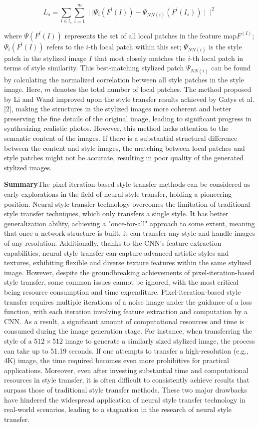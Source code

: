 \begin{equation}
    L_s=\sum_{l\in {l_s}}\sum_{i=1}^m \mid\mid\Psi_i(F^l(I))-\Psi_{NN(i)}(F^l(I_s))\mid\mid^2
\end{equation}

where $\Psi(F^l(I))$ represents the set of all local patches in the feature map$F^(I)$; $\Psi_i(F^l(I))$ refers to the $i$-th local patch within this set; $\Psi_{NN(i)}$ is the style patch in the stylized image $I$ that most closely matches the $i$-th local patch in terms of style similarity. This best-matching stylized patch $\Psi_{NN(i)}$ can be found by calculating the normalized correlation between all style patches in the style image. Here, $m$ denotes the total number of local patches. The method proposed by Li and Wand improved upon the style transfer results achieved by Gatys et al.[2], making the structures in the stylized images more coherent and better preserving the fine details of the original image, leading to significant progress in synthesizing realistic photos. However, this method lacks attention to the semantic content of the images. If there is a substantial structural difference between the content and style images, the matching between local patches and style patches might not be accurate, resulting in poor quality of the generated stylized images.

\textbf{Summary}\quad The pixel-iteration-based style transfer methods can be considered as early explorations in the field of neural style transfer, holding a pioneering position.
Neural style transfer technology overcomes the limitation of traditional style transfer techniques, which only transfers a single style. It has better generalization ability, achieving a "once-for-all" approach to some extent, meaning that once a network structure is built, it can transfer any style and handle images of any resolution. Additionally, thanks to the CNN's feature extraction capabilities, neural style transfer can capture advanced artistic styles and textures, exhibiting flexible and diverse texture features within the same stylized image.
However, despite the groundbreaking achievements of pixel-iteration-based style transfer, some common issues cannot be ignored, with the most critical being resource consumption and time expenditure. Pixel-iteration-based style transfer requires multiple iterations of a noise image under the guidance of a loss function, with each iteration involving feature extraction and computation by a CNN. As a result, a significant amount of computational resources and time is consumed during the image generation stage. For instance, when transferring the style of a $512\times 512$ image to generate a similarly sized stylized image, the process can take up to 51.19 seconds\citep{01jing2019neural}. If one attempts to transfer a high-resolution (e.g., 4K) image, the time required becomes even more prohibitive for practical applications.
Moreover, even after investing substantial time and computational resources in style transfer, it is often difficult to consistently achieve results that surpass those of traditional style transfer methods.
These two major drawbacks have hindered the widespread application of neural style transfer technology in real-world scenarios, leading to a stagnation in the research of neural style transfer. 



